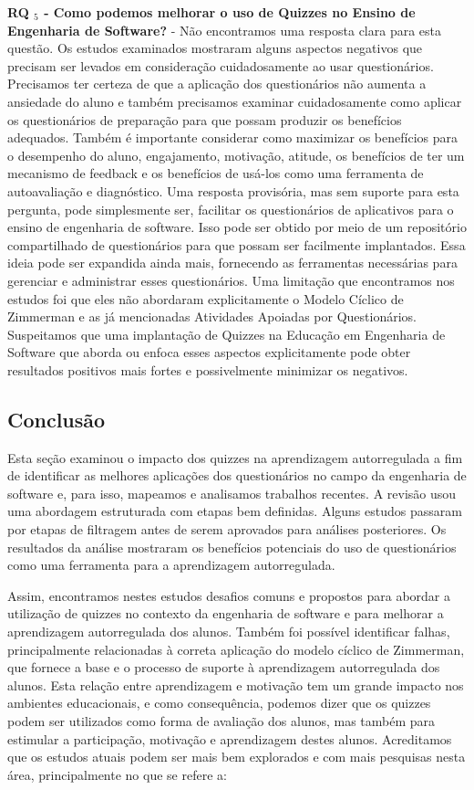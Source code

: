 \textbf{RQ $ _5 $ - Como podemos melhorar o uso de Quizzes no Ensino de Engenharia de Software?} - Não encontramos uma resposta clara para esta questão. Os estudos examinados mostraram alguns aspectos negativos que precisam ser levados em consideração cuidadosamente ao usar questionários. Precisamos ter certeza de que a aplicação dos questionários não aumenta a ansiedade do aluno e também precisamos examinar cuidadosamente como aplicar os questionários de preparação para que possam produzir os benefícios adequados. Também é importante considerar como maximizar os benefícios para o desempenho do aluno, engajamento, motivação, atitude, os benefícios de ter um mecanismo de feedback e os benefícios de usá-los como uma ferramenta de autoavaliação e diagnóstico. Uma resposta provisória, mas sem suporte para esta pergunta, pode simplesmente ser, facilitar os questionários de aplicativos para o ensino de engenharia de software. Isso pode ser obtido por meio de um repositório compartilhado de questionários para que possam ser facilmente implantados. Essa ideia pode ser expandida ainda mais, fornecendo as ferramentas necessárias para gerenciar e administrar esses questionários. Uma limitação que encontramos nos estudos foi que eles não abordaram explicitamente o Modelo Cíclico de Zimmerman e as já mencionadas Atividades Apoiadas por Questionários. Suspeitamos que uma implantação de Quizzes na Educação em Engenharia de Software que aborda ou enfoca esses aspectos explicitamente pode obter resultados positivos mais fortes e possivelmente minimizar os negativos.

\subsection{Conclusão}

Esta seção examinou o impacto dos quizzes na aprendizagem autorregulada a fim de identificar as melhores aplicações dos questionários no campo da engenharia de software e, para isso, mapeamos e analisamos trabalhos recentes. A revisão usou uma abordagem estruturada com etapas bem definidas. Alguns estudos passaram por etapas de filtragem antes de serem aprovados para análises posteriores. Os resultados da análise mostraram os benefícios potenciais do uso de questionários como uma ferramenta para a aprendizagem autorregulada.

Assim, encontramos nestes estudos desafios comuns e propostos para abordar a utilização de quizzes no contexto da engenharia de software e para melhorar a aprendizagem autorregulada dos alunos. Também foi possível identificar falhas, principalmente relacionadas à correta aplicação do modelo cíclico de Zimmerman, que fornece a base e o processo de suporte à aprendizagem autorregulada dos alunos. Esta relação entre aprendizagem e motivação tem um grande impacto nos ambientes educacionais, e como consequência, podemos dizer que os quizzes podem ser utilizados como forma de avaliação dos alunos, mas também para estimular a participação, motivação e aprendizagem destes alunos. Acreditamos que os estudos atuais podem ser mais bem explorados e com mais pesquisas nesta área, principalmente no que se refere a:

